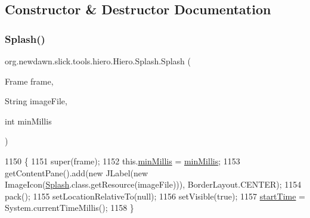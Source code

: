 \subsection{Constructor \& Destructor Documentation}
\mbox{\label{classorg_1_1newdawn_1_1slick_1_1tools_1_1hiero_1_1_hiero_1_1_splash_a99f1c81dda31cc8343280493b4d90c7f}} 
\subsubsection{\texorpdfstring{Splash()}{Splash()}}
{\footnotesize\ttfamily org.\+newdawn.\+slick.\+tools.\+hiero.\+Hiero.\+Splash.\+Splash (\begin{DoxyParamCaption}\item[{Frame}]{frame,  }\item[{String}]{image\+File,  }\item[{int}]{min\+Millis }\end{DoxyParamCaption})\hspace{0.3cm}{\ttfamily [inline]}}


\begin{DoxyCode}
1150                                                                      \{
1151             super(frame);
1152             this.\mbox{\hyperlink{classorg_1_1newdawn_1_1slick_1_1tools_1_1hiero_1_1_hiero_1_1_splash_a4a6f03856af4186e89f91fc54d722ca7}{minMillis}} = \mbox{\hyperlink{classorg_1_1newdawn_1_1slick_1_1tools_1_1hiero_1_1_hiero_1_1_splash_a4a6f03856af4186e89f91fc54d722ca7}{minMillis}};
1153             getContentPane().add(\textcolor{keyword}{new} JLabel(\textcolor{keyword}{new} ImageIcon(\mbox{\hyperlink{classorg_1_1newdawn_1_1slick_1_1tools_1_1hiero_1_1_hiero_1_1_splash_a99f1c81dda31cc8343280493b4d90c7f}{Splash}}.class.getResource(imageFile))), 
      BorderLayout.CENTER);
1154             pack();
1155             setLocationRelativeTo(null);
1156             setVisible(\textcolor{keyword}{true});
1157             \mbox{\hyperlink{classorg_1_1newdawn_1_1slick_1_1tools_1_1hiero_1_1_hiero_1_1_splash_a455ff850b006e49cfa0cfeb29cdcd022}{startTime}} = System.currentTimeMillis();
1158         \}
\end{DoxyCode}


